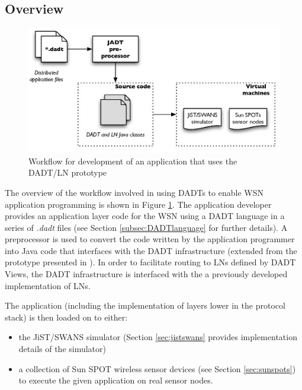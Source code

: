 \subsection{Overview}
\begin{figure}
\centering
\includegraphics[width=\textwidth]{img/DADTLN_workflow.eps} 
\caption[DADT/LN application workflow]{Workflow for development of an application that uses
the DADT/LN prototype}
\label{Fig:DADTLN_architecture}
\end{figure} 
The overview of the workflow involved in using DADTs to enable WSN application
programming is shown in Figure \ref{Fig:DADTLN_architecture}. The application
developer provides an application layer code for the WSN using a DADT
language in a series of \emph{.dadt} files (see Section
\ref{subsec:DADTlanguage} for further details). A preprocessor is used to
convert the code written by the application programmer into Java code that interfaces with the DADT infrastructure (extended from the prototype presented in
\cite{migliavacca_DADT:2006}). In order to facilitate routing to LNs defined by DADT Views, the DADT infrastructure is interfaced with the a
previously developed implementation of LNs. 

The application (including the implementation of layers lower in the protocol
stack) is then loaded on to either:
\begin{itemize}
\item the JiST/SWANS simulator \cite{barr_JIST:2005, barr_SWANS} (Section
\ref{sec:jistswans} provides implementation details of the simulator) 
\item a collection of Sun SPOT wireless sensor devices
\cite{simon_squawk:2006} (see Section \ref{sec:sunspots}) to execute the given 
application on real sensor nodes.
\end{itemize}

